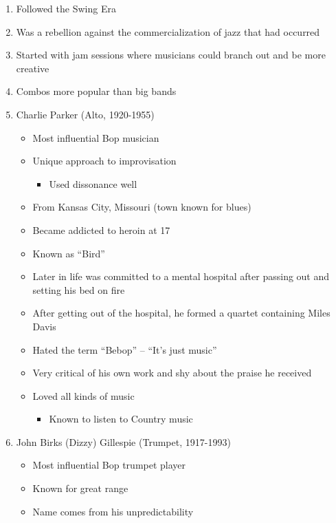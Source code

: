 \documentclass[]{article}
\providecommand{\tightlist}{%
  \setlength{\itemsep}{0pt}\setlength{\parskip}{0pt}}
\begin{document}
\begin{enumerate}
\def\labelenumi{\arabic{enumi}.}
\tightlist
\item
  Followed the Swing Era
\item
  Was a rebellion against the commercialization of jazz that had
  occurred
\item
  Started with jam sessions where musicians could branch out and be more
  creative
\item
  Combos more popular than big bands
\item
  Charlie Parker (Alto, 1920-1955)

  \begin{itemize}
  \tightlist
  \item
    Most influential Bop musician
  \item
    Unique approach to improvisation

    \begin{itemize}
    \tightlist
    \item
      Used dissonance well
    \end{itemize}
  \item
    From Kansas City, Missouri (town known for blues)
  \item
    Became addicted to heroin at 17
  \item
    Known as ``Bird''
  \item
    Later in life was committed to a mental hospital after passing out
    and setting his bed on fire
  \item
    After getting out of the hospital, he formed a quartet containing
    Miles Davis
  \item
    Hated the term ``Bebop'' -- ``It's just music''
  \item
    Very critical of his own work and shy about the praise he received
  \item
    Loved all kinds of music

    \begin{itemize}
    \tightlist
    \item
      Known to listen to Country music
    \end{itemize}
  \end{itemize}
\item
  John Birks (Dizzy) Gillespie (Trumpet, 1917-1993)

  \begin{itemize}
  \tightlist
  \item
    Most influential Bop trumpet player
  \item
    Known for great range
  \item
    Name comes from his unpredictability


\end{itemize}
\end{enumerate}
\end{document}
